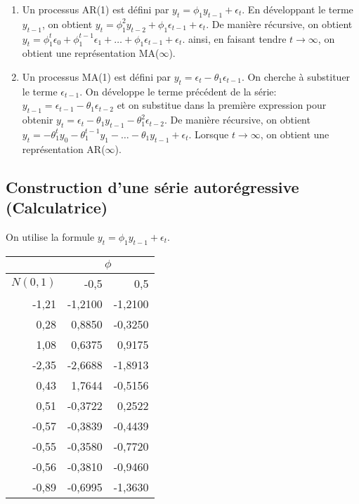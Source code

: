 \documentclass{article}
\begin{document}
\begin{enumerate}
\item Un processus AR(1) est défini par $y_t = \phi_1y_{t-1} + \epsilon_t$. En développant le terme $y_{t-1}$, on obtient $y_t = \phi_1^2y_{t-2}+\phi_1\epsilon_{t-1}+\epsilon_t$. De manière récursive, on obtient $y_t = \phi_1^{t}\epsilon_0 + \phi_1^{t-1}\epsilon_1 + \ldots + \phi_1\epsilon_{t-1} + \epsilon_t$. ainsi, en faisant tendre $t\to\infty$, on obtient une représentation MA($\infty$).

\item Un processus MA(1) est défini par $y_t = \epsilon_t - \theta_1\epsilon_{t-1}$. On cherche à substituer le terme $\epsilon_{t-1}$. On développe le terme précédent de la série: $y_{t-1} = \epsilon_{t-1} - \theta_1\epsilon_{t-2}$ et on substitue dans la première expression pour obtenir $y_t = \epsilon_t - \theta_1y_{t-1} - \theta_1^2\epsilon_{t-2}$. De manière récursive, on obtient $y_t = -\theta_1^ty_0-\theta_1^{t-1}y_1-\ldots-\theta_1y_{t-1}+\epsilon_{t}$. Lorsque $t\to\infty$, on obtient une représentation AR($\infty$).
\end{enumerate}


\clearpage
\subsection{Construction d'une série autorégressive (Calculatrice)}

On utilise la formule $y_t = \phi_1y_{t-1} + \epsilon_t$.

\begin{center}
\begin{tabular}{|r|r|r|}
\hline
\multicolumn{1}{|l|}{} & \multicolumn{ 2}{c|}{$\phi$} \\ \hline
\multicolumn{1}{|l|}{$N(0,1)$} & -0,5 & 0,5 \\ \hline
-1,21 & -1,2100 & -1,2100 \\ \hline
0,28 & 0,8850 & -0,3250 \\ \hline
1,08 & 0,6375 & 0,9175 \\ \hline
-2,35 & -2,6688 & -1,8913 \\ \hline
0,43 & 1,7644 & -0,5156 \\ \hline
0,51 & -0,3722 & 0,2522 \\ \hline
-0,57 & -0,3839 & -0,4439 \\ \hline
-0,55 & -0,3580 & -0,7720 \\ \hline
-0,56 & -0,3810 & -0,9460 \\ \hline
-0,89 & -0,6995 & -1,3630 \\ \hline
\end{tabular}
\end{center}
\end{document}
